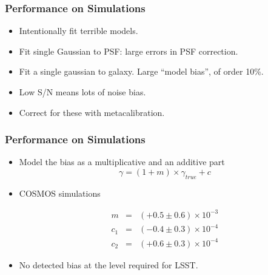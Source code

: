 \documentclass{beamer}
\newcommand{\mcal}{metacalibration}
\begin{document}
\frame
{
    \frametitle{Performance on Simulations}

 
    \begin{itemize}
        \item Intentionally fit terrible models.

        \item Fit single Gaussian to PSF: large errors in
            PSF correction.

        \item Fit a single gaussian to galaxy. Large ``model bias'', of order 10\%.
            
        \item Low S/N means lots of noise bias.

        \item Correct for these with \mcal.

    \end{itemize}
}

\frame
{
    \frametitle{Performance on Simulations}

 
    \begin{itemize}
            
            
         \item Model the bias as a multiplicative and an additive part
        {\color{lightskyblue} 
            \begin{equation}
                \gamma = (1 + m ) \times \gamma_{true} + c \nonumber
            \end{equation}
        }


         \item COSMOS simulations

        {\color{gold} 
            \begin{eqnarray}
                m & = & (+0.5 \pm 0.6) \times 10^{-3} \nonumber \\
              c_1 & = & (-0.4 \pm 0.3) \times 10^{-4} \nonumber \\
              c_2 & = & (+0.6 \pm 0.3) \times 10^{-4} \nonumber
            \end{eqnarray}
        }
         \item No detected bias at the level required for LSST.

    \end{itemize}

}
\end{document}
